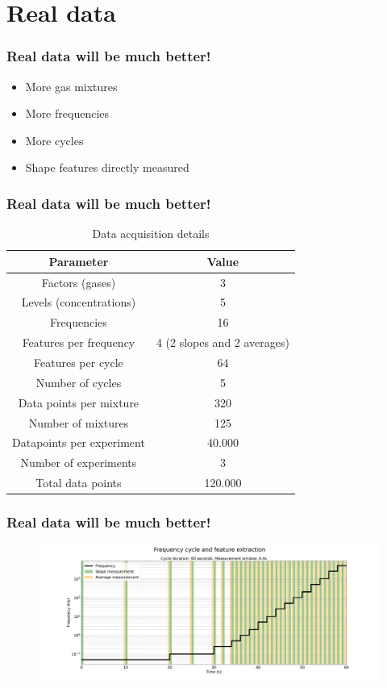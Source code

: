 \documentclass{beamer}
\begin{document}
\section{Real data}
\begin{frame}
	
	\frametitle{Real data will be much better!}
	\pause
	\begin{itemize}
		\item More gas mixtures
		\pause
		\item More frequencies
		\pause
		\item More cycles
		\pause
		\item Shape features directly measured
		\end{itemize}
\end{frame}

\begin{frame}
	\frametitle{Real data will be much better!}
	\pause
	\begin{table}[h]
		\centering
		\caption{Data acquisition details}
		\label{tab:measurements}
		\begin{tabular}{|c|c|}
			\hline
			\textbf{Parameter} & \textbf{Value} \\
			\hline
			Factors (gases) & 3 \\
			\hline
			Levels (concentrations) & 5 \\
			\hline
			Frequencies & 16 \\
			\hline
			Features per frequency & 4 (2 slopes and 2 averages) \\
			\hline
			Features per cycle & 64 \\
			\hline
			Number of cycles & 5 \\
			\hline
			Data points per mixture & 320 \\
			\hline
			Number of mixtures & 125 \\
			\hline
			Datapoints per experiment & 40.000 \\
			\hline
			Number of experiments & 3 \\
			\hline
			Total data points & 120.000 \\
			\hline
		\end{tabular}
	\end{table}
\end{frame}

\begin{frame}
	\frametitle{Real data will be much better!}
	\begin{figure}[!htb]
		\centering
		\includegraphics[width=1\textwidth]{../../figures/measurement-windows.png}
		\label{fig:feat-window}
	\end{figure} 
\end{frame}
\end{document}
